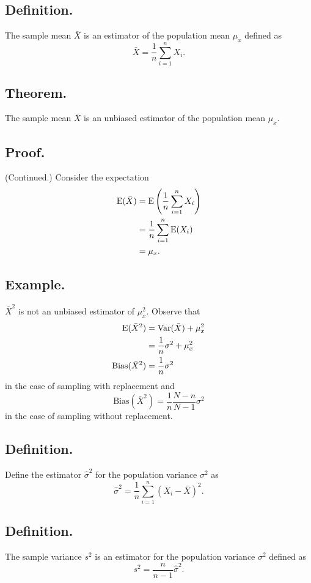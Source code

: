 \documentclass[titlepage]{article}
\begin{document}
\subsection{Definition.} The sample mean $\bar{X}$ is an estimator of the population mean $\mu_{x}$ defined as 
$$\bar{X} = \frac{1}{n}\sum_{i=1}^{n}X_{i}.$$

\subsection{Theorem.} The sample mean $\bar{X}$ is an unbiased estimator of the population mean $\mu_{x}$.

\subsection{Proof.} (Continued.) Consider the expectation
\begin{align*}
    \text{E}(\bar{X}) &= \text{E}\left(\frac{1}{n}\sum_{i=1}^{n}X_{i}\right) \\
                &= \frac{1}{n}\sum_{i=1}^{n}\text{E}(X_{i}) \\
                &= \mu_{x}.
\end{align*}

\subsection{Example.} $\bar{X}^{2}$ is not an unbiased estimator of $\mu_{x}^{2}$. Observe that 
\begin{align*}
             \text{E}(\bar{X}^{2}) &= \text{Var}(\bar{X}) + \mu_{x}^{2} \\
                             &= \frac{1}{n}\sigma^{2} + \mu_{x}^{2} \\
    \text{Bias}(\bar{X}^{2}) &= \frac{1}{n}\sigma^{2}
\end{align*}
in the case of sampling with replacement and 
$$\text{Bias}(\bar{X}^{2}) = \frac{1}{n}\frac{N-n}{N-1}\sigma^{2}$$
in the case of sampling without replacement.

\subsection{Definition.} Define the estimator $\hat{\sigma}^{2}$ for the population variance $\sigma^{2}$ as 
$$\hat{\sigma}^{2} = \frac{1}{n}\sum_{i=1}^{n}(X_{i} - \bar{X})^{2}.$$

\subsection{Definition.} The sample variance $s^{2}$ is an estimator for the population variance $\sigma^{2}$ defined as 
$$s^{2} = \frac{n}{n-1}\hat{\sigma}^{2}.$$
\end{document}
